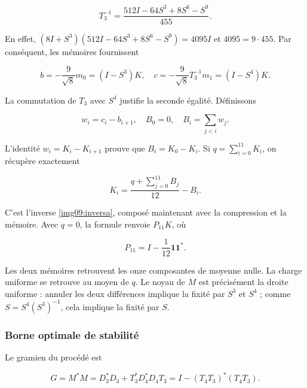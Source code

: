 \begin{equation}
T_3^{-1}=\frac{512I-64S^3+8S^6-S^9}{455}.
\label{nuc11:eq:3}
\end{equation}



En effet,
\((8I+S^3)(512I-64S^3+8S^6-S^9)=4095I\)
et \(4095=9\cdot455\).
Par conséquent, les mémoires fournissent



\begin{equation}
b=-\frac9{\sqrt8}m_0=(I-S^3)K,
\quad c=-\frac9{\sqrt8}T_3^{-1}m_1=(I-S^4)K.
\label{nuc11:eq:4}
\end{equation}



La commutation de \(T_3\) avec \(S^4\) justifie la seconde égalité.
Définissons



\[
w_i=c_i-b_{i+1},\quad B_0=0,\quad
B_i=\sum_{j<i}w_j.
\]



L’identité \(w_i=K_i-K_{i+1}\) prouve que \(B_i=K_0-K_i\).
Si \(q=\sum_{i=0}^{11}K_i\), on récupère exactement




\begin{equation}
K_i=\frac{q+\sum_{j=0}^{11}B_j}{12}-B_i.
\label{nuc11:eq:5}
\end{equation}



C’est l’inverse \eqref{img09:inversa}, composé maintenant avec la
compression et la mémoire. Avec \(q=0\), la formule renvoie
\(P_{11}K\), où



\[
P_{11}=I-\frac1{12}\mathbf1\mathbf1^*.
\]



Les deux mémoires retrouvent les onze composantes de moyenne nulle.
La charge uniforme se retrouve au moyen de \(q\).
Le noyau de \(M\) est précisément la droite uniforme :
annuler les deux différences implique la fixité par \(S^3\) et \(S^4\) ;
comme \(S=S^4(S^3)^{-1}\), cela implique la fixité par \(S\).

\subsubsection{Borne optimale de stabilité
}

Le gramien du procédé est




\begin{equation}
G=M^*M=D_3^*D_3+T_3^*D_4^*D_4T_3
=I-(T_4T_3)^*(T_4T_3).
\label{nuc11:eq:6}
\end{equation}



